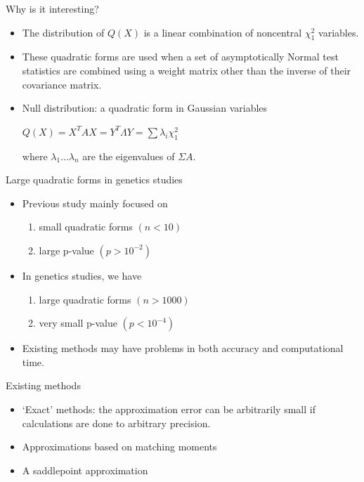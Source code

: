 \documentclass{beamer}
\begin{document}
\begin{frame}{Why is it interesting?}
\begin{center}
  \begin{itemize}
   \item The distribution of $Q(X)$ is a linear combination of noncentral $\chi_1^2$ variables.
   \bigskip
  
   \item These quadratic forms are used when a set of asymptotically Normal test statistics
are combined using a weight matrix other than the inverse of their covariance matrix.
   \bigskip
   
   \item{ Null distribution: a quadratic form in Gaussian variables\\
   \begin{center}
   $Q(X) = X^TAX = Y^T\Lambda Y =\sum \lambda_i \chi^2_1$
   \end{center}
   where $\lambda_1 \dots \lambda_n$ are the eigenvalues of $\Sigma A$.
  }
  \end{itemize}
\end{center}
\end{frame}
\begin{frame}{Large quadratic forms in genetics studies}
 \begin{itemize}
   \item Previous study mainly focused on 
   \begin{enumerate}
      \item small quadratic forms $(n < 10)$
      \item large p-value $(p > 10^{-2})$
   \end{enumerate}
   \bigskip
   \item In genetics studies, we have 
   \begin{enumerate}
      \item large quadratic forms $(n > 1000)$
      \item very small p-value $(p < 10^{-4})$
   \end{enumerate}
   \bigskip
   \item Existing methods may have problems in both accuracy and computational time.
   \end{itemize}
\end{frame}

\begin{frame}{Existing methods}
 \begin{itemize}
    \item `Exact' methods: the approximation error can be arbitrarily small if calculations are done to arbitrary precision. 
    \bigskip
    \item Approximations based on matching moments 
    \bigskip
    \item A saddlepoint approximation
    
   \end{itemize}
\end{frame}
\end{document}
